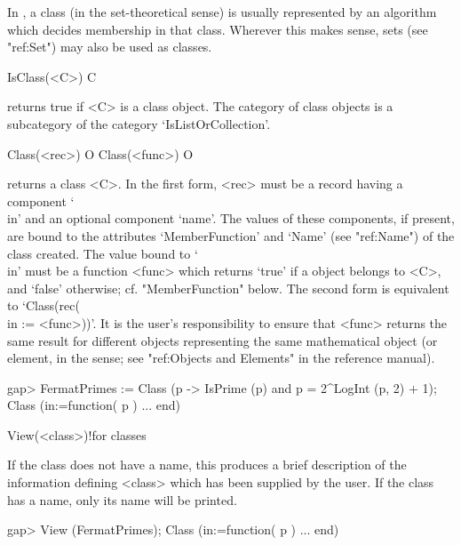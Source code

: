 
In {\CRISP}, a class (in the set-theoretical sense) is usually represented
by an algorithm which decides membership in that class. Wherever this makes
sense, sets (see "ref:Set") may also be used as classes.


\null


\>IsClass(<C>) C

returns true if <C> is a class object. The category of class objects is a
subcategory of the category `IsListOrCollection'.

\>Class(<rec>) O
\>Class(<func>) O

returns a class <C>. In the first form, <rec> must be a record having a
component `\\in' and an optional component `name'. The values of these
components, if present, are bound to the attributes `MemberFunction' and
`Name' (see "ref:Name") of the class created. The value bound to `\\in' must be a function
<func> which returns `true' if a {\GAP} object belongs to <C>, and `false'
otherwise; cf. "MemberFunction" below. The second form is equivalent to `Class(rec(\\in
:= <func>))'. It is the user's responsibility to ensure that <func> returns the same
result for different {\GAP} objects representing the same mathematical object (or
element, in the {\GAP} sense; see "ref:Objects and Elements" in the {\GAP}
reference manual).

\beginexample
gap> FermatPrimes := Class (p -> IsPrime (p) and p = 2^LogInt (p, 2) + 1); 
Class (in:=function( p ) ... end)
\endexample

\>View(<class>)!{for classes}

If the class does not have a name, this produces a brief description of the
information defining <class> which has been supplied by the user. If the
class has a name, only its name will be printed.

\begintt
gap> View (FermatPrimes);
Class (in:=function( p ) ... end)
\endtt

